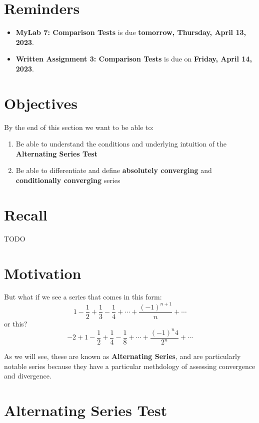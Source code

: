 \documentclass{report}
\begin{document}
\begin{sloppypar}
\section{Reminders}
\begin{itemize}
  \item \textbf{MyLab 7: Comparison Tests} is due
        \textbf{tomorrow, Thursday, April 13, 2023}.
  \item \textbf{Written Assignment 3: Comparison Tests}
        is due on \textbf{Friday, April 14, 2023}.
\end{itemize}

\section{Objectives}
By the end of this section we want to be able to:
\begin{enumerate}
  \item Be able to understand the conditions and
        underlying intuition of the
        \textbf{Alternating Series Test}
  \item Be able to differentiate and define
        \textbf{absolutely converging} and
        \textbf{conditionally converging} series
\end{enumerate}

\section{Recall}
TODO

\section{Motivation}
But what if we see a series that comes in this form:
\[ 1 - \frac{1}{2} + \frac{1}{3} - \frac{1}{4} + \cdots +
  \frac{(-1)^{n+1}}{n} + \cdots \]
or this?
\[ -2 + 1 - \frac{1}{2} + \frac{1}{4} - \frac{1}{8} +
\cdots + \frac{(-1)^{n}4}{2^{n}} + \cdots\]

As we will see, these are known as
\textbf{Alternating Series}, and are particularly notable
series because they have a particular methdology of
assessing convergence and divergence.
\section{Alternating Series Test}

\begin{center}
\end{center}
\end{sloppypar}
\end{document}
